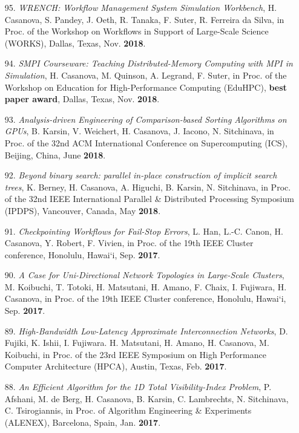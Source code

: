 \begin{enumerate}
\item [95.] {\it WRENCH: Workflow Management System Simulation Workbench}, H. Casanova, S. Pandey, J. Oeth, R. Tanaka, F. Suter, R. Ferreira da Silva, in Proc. of the Workshop on Workflows in Support of Large-Scale Science (WORKS), Dallas, Texas, Nov. {\bf 2018}.

\item [94.] {\it SMPI Courseware: Teaching Distributed-Memory Computing with MPI in Simulation}, H. Casanova, M. Quinson, A. Legrand, F. Suter, in Proc. of the Workshop on Education for High-Performance Computing (EduHPC), {\bf best paper award}, Dallas, Texas, Nov. {\bf 2018}.

\item [93.] {\it Analysis-driven Engineering of Comparison-based Sorting
    Algorithms on GPUs},
    B. Karsin, V. Weichert, H. Casanova, J. Iacono, N. Sitchinava, 
in Proc. of the 32nd ACM International Conference on Supercomputing
(ICS), Beijing, China, June {\bf 2018}.

\item [92.] {\it Beyond binary search: parallel in-place construction of implicit search trees},
K. Berney, H. Casanova, A. Higuchi, B. Karsin, N. Sitchinava,
in Proc. of the 32nd IEEE International Parallel \& Distributed Processing Symposium (IPDPS), Vancouver, Canada, May {\bf 2018}.


\item [91.] {\it Checkpointing Workflows for Fail-Stop Errors},
L. Han, L.-C. Canon, H. Casanova, Y. Robert, F. Vivien, 
in Proc. of the 19th IEEE Cluster conference, Honolulu, Hawai`i, Sep. {\bf 2017}. 

\item [90.] {\it A Case for Uni-Directional Network Topologies in Large-Scale Clusters}, 
M. Koibuchi, T. Totoki, H. Matsutani, H. Amano, F. Chaix, I. Fujiwara, H. Casanova, 
in Proc. of the 19th IEEE Cluster conference, Honolulu, Hawai`i, Sep. {\bf 2017}. 

\item [89.] {\it High-Bandwidth Low-Latency Approximate Interconnection
Networks}, D. Fujiki, K. Ishii, I. Fujiwara. H. Matsutani, H. Amano, H.
Casanova, M. Koibuchi, in Proc. of the 23rd IEEE Symposium on High
Performance Computer Architecture (HPCA), Austin, Texas, Feb. {\bf 2017}.

\item [88.] {\it An Efficient Algorithm for the 1D Total Visibility-Index
Problem}, P. Afshani, M. de Berg, H. Casanova, B. Karsin, C. Lambrechts, N.
Sitchinava, C. Tsirogiannis, in Proc. of Algorithm Engineering \&
Experiments (ALENEX), Barcelona, Spain, Jan. {\bf 2017}.


\end{enumerate}
